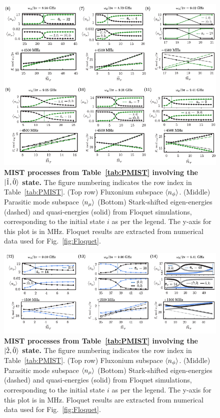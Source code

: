 \documentclass[%
reprint,
superscriptaddress,
 amsmath,amssymb,
 aps,
 prx,
longbibliography,
floatfix,
]{revtex4-2}
\begin{document}
\begin{figure}
    \centering
    \includegraphics[width=1.0\textwidth]{Supp_Fig/Trans1.pdf}
    \caption{\textbf{MIST processes from Table~\ref{tab:PMIST} involving the $\ket{\tilde{1},\tilde{0}}$ state.} The figure numbering indicates the row index in Table~\ref{tab:PMIST}. (Top row) Fluxonium subspace $\braket{n_\phi}$. (Middle) Parasitic mode subspace $\braket{n_\mu}$ (Bottom) Stark-shifted eigen-energies (dashed) and quasi-energies (solid) from Floquet simulations, corresponding to the initial state $i$ as per the legend. The y-axis for this plot is in MHz. Floquet results are extracted from numerical data used for Fig.~\ref{fig:Floquet}.}
    \label{fig:Trans1}
\end{figure}
\begin{figure}
    \centering
    \includegraphics[width=1.0\textwidth]{Supp_Fig/Trans2.pdf}
    \caption{\textbf{MIST processes from Table~\ref{tab:PMIST} involving the $\ket{\tilde{2},\tilde{0}}$ state.} The figure numbering indicates the row index in Table~\ref{tab:PMIST}. (Top row) Fluxonium subspace $\braket{n_\phi}$. (Middle) Parasitic mode subspace $\braket{n_\mu}$ (Bottom) Stark-shifted eigen-energies (dashed) and quasi-energies (solid) from Floquet simulations, corresponding to the initial state $i$ as per the legend. The y-axis for this plot is in MHz. Floquet results are extracted from numerical data used for Fig.~\ref{fig:Floquet}.}
    \label{fig:Trans2}
\end{figure}
\end{document}
